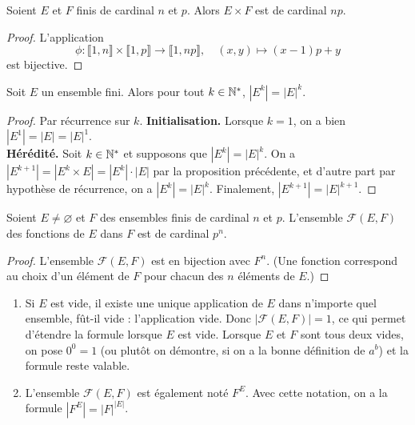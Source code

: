 \begin{proposition}
Soient $E$ et $F$ finis de cardinal $n$ et $p$. Alors $E\times F$ est de cardinal $np$.
\end{proposition}
\begin{proof}
L'application 
\[
\phi : \llbracket 1,n\rrbracket \times \llbracket 1,p\rrbracket\to \llbracket 1,np\rrbracket,\quad
(x,y)\mapsto (x-1)p+y
\]
est bijective.
\end{proof}
\begin{corollaire}
Soit $E$ un ensemble fini. Alors pour tout $k\in \mathbb{N}^*$, $|E^k|=|E|^k$.
\end{corollaire}
\begin{proof}
Par récurrence sur $k$. 
\textbf{Initialisation. }Lorsque $k=1$, on a bien  $|E^1|=|E|=|E|^1$.\\
\textbf{Hérédité.} Soit $k\in \mathbb{N}^*$ et supposons que $|E^k|=|E|^k$.
On a $|E^{k+1}| = |E^k\times E|=|E^k|\cdot |E|$ par la proposition précédente, et d'autre part par hypothèse de récurrence, on a $|E^k|=|E|^k$. Finalement,  $|E^{k+1}|=|E|^{k+1}$. 
\end{proof}

\begin{corollaire}
Soient $E\neq \varnothing$ et $F$ des ensembles finis de cardinal  $n$ et $p$. L'ensemble $\mathcal F(E,F)$ des fonctions de $E$ dans $F$ est de cardinal $p^n$. 
\end{corollaire}
\begin{proof}
L'ensemble $\mathcal F(E,F)$ est en bijection avec $F^n$. (Une fonction correspond au choix d'un élément de $F$ pour chacun des $n$ éléments de $E$.) 
\end{proof}

\begin{remarque}
\begin{enumerate}
\item Si $E$ est vide, il existe une unique application de $E$ dans n'importe quel ensemble, fût-il vide : l'application vide. Donc $|\mathcal F(E,F)|=1$, ce qui permet d'étendre la formule lorsque $E$ est vide. Lorsque $E$ et $F$ sont tous deux vides, on pose $0^0=1$ (ou plutôt on démontre, si on a la \og bonne\fg{} définition de $a^b$) et la formule reste valable.
\item L'ensemble $\mathcal F(E,F)$ est également noté $F^E$. Avec cette notation, on a la formule $\left| F^E\right| = |F|^{|E|}$.
\end{enumerate}
\end{remarque}

